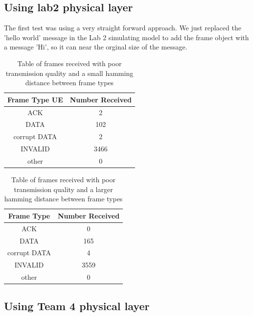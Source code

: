 \subsection{Using lab2 physical layer}
The first test was using a very straight forward approach. We just replaced the 'hello world' message in the Lab 2 
simulating model to add the frame object with a message 'Hi', so it can near the orginal size of the message.

\begin{table}[ht]
	\centering
		\begin{tabular}{| c | c | }
		\hline                       
		Frame Type UE & Number Received\\
		\hline
			ACK & 2\\
			DATA & 102\\
			corrupt DATA & 2\\
			INVALID & 3466\\
			other & 0\\
		\hline
		\end{tabular}
	\caption{Table of frames received with poor transmission quality and a small hamming distance between frame types}
	\label{tab:2ACK}
\end{table}

\begin{table}[ht]
	\centering
		\begin{tabular}{| c | c | }
		\hline                       
		Frame Type & Number Received\\
		\hline
			ACK & 0\\
			DATA & 165\\
			corrupt DATA & 4\\
			INVALID & 3559\\
			other & 0\\
		\hline
		\end{tabular}
	\caption{Table of frames received with poor transmission quality and a larger hamming distance between frame types}
	\label{tab:0ACK}
\end{table}

\subsection{Using Team 4 physical layer}

